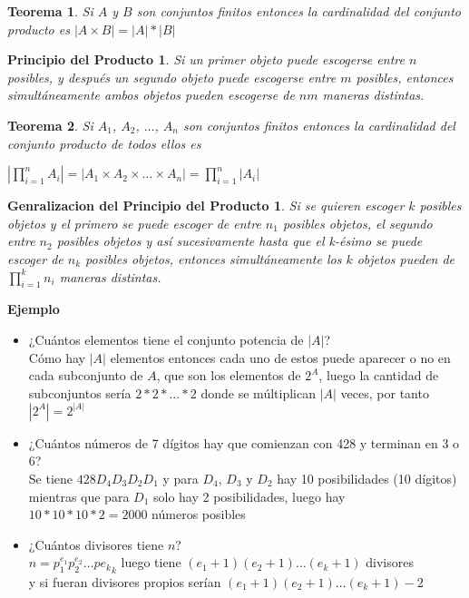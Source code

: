 \documentclass[a4paper,12pt]{report}
\newtheorem*{ppr}{Principio del Producto}
\newtheorem*{gppr}{Genralizacion del Principio del Producto}
\newtheorem*{teo}{Teorema}
\begin{document}
\begin{teo}
 Si $A$ y $B$ son conjuntos finitos entonces la cardinalidad del conjunto producto es $|A\times B|=|A|*|B|$
\end{teo}


\begin{ppr}
 Si un primer objeto puede escogerse entre $n$ posibles, y después un segundo objeto puede escogerse entre $m$ posibles, entonces simultáneamente ambos objetos pueden escogerse de
 $nm$ maneras distintas.
\end{ppr}

\begin{teo}
 Si $A_1$, $A_2$, $\dots$, $A_n$ son conjuntos finitos entonces la cardinalidad del conjunto producto de todos ellos es 
 
 $|\prod^n_{i=1}A_i|=|A_1\times A_2\times \dots\times A_n|=\prod^n_{i=1}|A_i|$
\end{teo}

\begin{gppr}
 Si se quieren escoger $k$ posibles objetos y el primero se puede escoger de entre $n_1$ posibles objetos, el segundo entre $n_2$ posibles objetos y así sucesivamente hasta que el k-ésimo se puede escoger de $n_k$ posibles objetos, entonces simultáneamente los $k$ objetos pueden de $\prod^k_{i=1}n_i$ maneras distintas.
\end{gppr}


\textbf{Ejemplo}

\begin{itemize}
 \item ¿Cuántos elementos tiene el conjunto potencia de $|A|$? \\
 Cómo hay $|A|$ elementos entonces cada uno de estos puede aparecer o no en cada subconjunto de $A$, que son los elementos de $2^A$, luego la cantidad de subconjuntos sería $2*2*...*2$ donde se múltiplican $|A|$ veces, por tanto $|2^A|=2^{|A|}$
 
 \item ¿Cuántos números de 7 dígitos hay que comienzan con 428 y terminan en 3 o 6?\\
  Se tiene $428D_4D_3D_2D_1$ y para $D_4$, $D_3$ y $D_2$ hay 10 posibilidades (10 dígitos) mientras que para $D_1$ solo hay 2 posibilidades, luego hay\\ 
 $10*10*10*2=2000$ números posibles
 
 \item ¿Cuántos divisores tiene $n$?\\
 $n=p^{e_1}_1 p^{e_2}_2 \dots p{e_k}_k$ luego tiene $(e_1+1)(e_2+1)\dots(e_k+1)$ divisores\\
 y si fueran divisores propios serían $(e_1+1)(e_2+1)\dots(e_k+1)-2$ 
 
\end{itemize}
\end{document}
